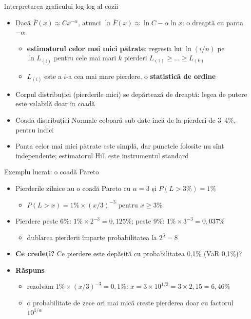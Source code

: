 \begin{frame}{Interpretarea graficului log-log al cozii}
\itemsize{\small}
\begin{itemize}
    \item Dacă $\bar F(x) \approx C x^{-\alpha}$, atunci $\ln \bar F(x) \approx \ln C - \alpha \ln x$: o dreaptă cu panta $-\alpha$
    \begin{itemize}
        \item \textbf{estimatorul celor mai mici pătrate}: regresia lui $\ln(i/n)$ pe $\ln L_{(i)}$ pentru cele mai mari $k$ pierderi $L_{(1)} \ge \dots \ge L_{(k)}$
        \item $L_{(i)}$ este a $i$-a cea mai mare pierdere, o \textbf{statistică de ordine}
    \end{itemize}
    \item Corpul distribuției (pierderile mici) se depărtează de dreaptă: legea de putere este valabilă doar în coadă
    \item Coada distribuției Normale coboară sub date încă de la pierderi de 3--4\%, pentru indici
    \item Panta celor mai mici pătrate este simplă, dar punctele folosite nu sînt independente; estimatorul Hill este instrumentul standard
\end{itemize}
\end{frame}

\begin{frame}{Exemplu lucrat: o coadă Pareto}
\itemsize{\small}
\begin{itemize}
    \item Pierderile zilnice au o coadă Pareto cu $\alpha = 3$ și $P(L > 3\%) = 1\%$
    \begin{itemize}
        \item $P(L > x) = 1\% \times (x/3)^{-3}$ pentru $x \ge 3\%$
    \end{itemize}
    \item Pierdere peste 6\%: $1\% \times 2^{-3} = 0{,}125\%$; peste 9\%: $1\% \times 3^{-3} = 0{,}037\%$
    \begin{itemize}
        \item dublarea pierderii împarte probabilitatea la $2^3 = 8$
    \end{itemize}
    \item \textbf{Ce credeți?} Ce pierdere este depășită cu probabilitatea 0,1\% (VaR 0,1\%)?
    \item \textbf{Răspuns}
    \begin{itemize}
        \item rezolvăm $1\% \times (x/3)^{-3} = 0{,}1\%$: $x = 3 \times 10^{1/3} = 3 \times 2{,}15 = 6{,}46\%$
        \item o probabilitate de zece ori mai mică crește pierderea doar cu factorul $10^{1/\alpha}$
    \end{itemize}
\end{itemize}
\end{frame}



